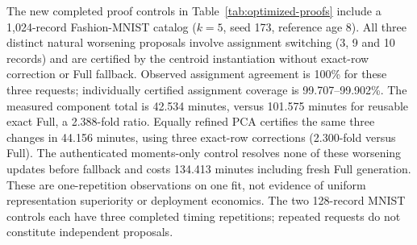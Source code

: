 The new completed proof controls in Table~\ref{tab:optimized-proofs}
include a 1,024-record Fashion-MNIST catalog ($k=5$, seed 173, reference
age 8). All three distinct natural worsening proposals involve assignment
switching (3, 9 and 10 records) and are certified by the centroid
instantiation without exact-row correction or Full fallback. Observed
assignment agreement is 100\% for these three requests; individually
certified assignment coverage is 99.707--99.902\%. The measured component
total is 42.534 minutes, versus 101.575 minutes for reusable exact Full,
a 2.388-fold ratio. Equally refined PCA certifies the same three changes
in 44.156 minutes, using three exact-row corrections (2.300-fold versus
Full). The authenticated moments-only control resolves none of these
worsening updates before fallback and costs 134.413 minutes including
fresh Full generation. These are one-repetition observations on one fit,
not evidence of uniform representation superiority or deployment economics.
The two 128-record MNIST controls each have three completed timing
repetitions; repeated requests do not constitute independent proposals.



